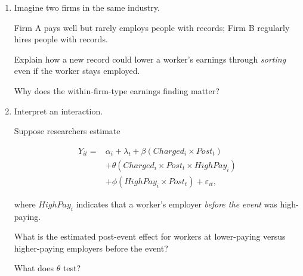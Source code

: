 \documentclass[11pt]{article}
\newif\ifinstructor
\newcommand{\answer}[1]{%
\ifinstructor
\par\smallskip\noindent
{\color{blue!55!black}\small
\textbf{Suggested answer:} #1}
\par
\fi
}
\begin{document}
\begin{enumerate}[resume]

\item Imagine two firms in the same industry.

Firm A pays well but rarely employs people with records;
Firm B regularly hires people with records.

Explain how a new record could lower a worker's earnings
through \emph{sorting} even if the worker stays employed.

Why does the within-firm-type earnings finding matter?

\answer{
A record can restrict access to high-paying employers and shift
a worker toward employers offering lower wages or hours.
But earnings declines within firm types suggest that employer
sorting alone does not fully explain the total earnings penalty.
Other wage, hours, or matching channels also matter.
}
\vspace{1.1cm}

\item Interpret an interaction.

Suppose researchers estimate

\[
\begin{aligned}
Y_{it}={}&
\alpha_i+\lambda_t
+\beta(Charged_i\times Post_t)\\
&+\theta(Charged_i\times Post_t\times HighPay_i)\\
&+\phi(HighPay_i\times Post_t)+\varepsilon_{it},
\end{aligned}
\]

where $HighPay_i$ indicates that a worker's employer
\emph{before the event} was high-paying.

What is the estimated post-event effect for workers at
lower-paying versus higher-paying employers before the event?

What does $\theta$ test?

\answer{
The estimated post-event effect is $\beta$ for $HighPay_i=0$
and $\beta+\theta$ for $HighPay_i=1$.
The coefficient $\theta$ measures the difference between these
two effects, not the overall effect for high-paying-firm workers.

Conditioning on the pre-event employer avoids defining groups
based on an outcome potentially affected by treatment.

This is a hypothetical specification, not the paper's regression.
}


\end{enumerate}
\end{document}
